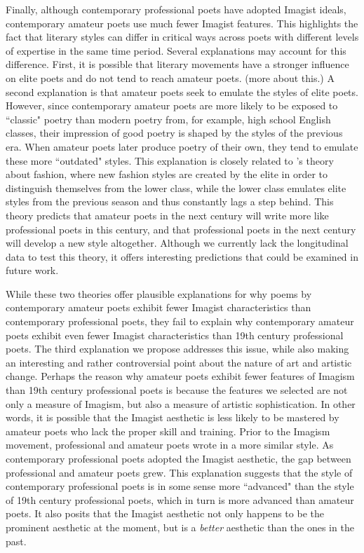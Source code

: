 \documentclass{book}
\begin{document}
Finally, although contemporary professional poets have adopted Imagist ideals, contemporary amateur poets use much fewer Imagist features. This highlights the fact that literary styles can differ in critical ways across poets with different levels of expertise in the same time period. Several explanations may account for this difference. First, it is possible that literary movements have a stronger influence on elite poets and do not tend to reach amateur poets. (more about this.) A second explanation is that amateur poets seek to emulate the styles of elite poets. However, since contemporary amateur poets are more likely to be exposed to ``classic" poetry than modern poetry from, for example, high school English classes, their impression of good poetry is shaped by the styles of the previous era. When amateur poets later produce poetry of their own, they tend to emulate these more ``outdated" styles. This explanation is closely related to \cite{simmel1957fashion}'s theory about fashion, where new fashion styles are created by the elite in order to distinguish themselves from the lower class, while the lower class emulates elite styles from the previous season and thus constantly lags a step behind. This theory predicts that amateur poets in the next century will write more like professional poets in this century, and that professional poets in the next century will develop a new style altogether. Although we currently lack the longitudinal data to test this theory, it offers interesting predictions that could be examined in future work.

While these two theories offer plausible explanations for why poems by contemporary amateur poets exhibit fewer Imagist characteristics than contemporary professional poets, they fail to explain why contemporary amateur poets exhibit even fewer Imagist characteristics than 19th century professional poets. The third explanation we propose addresses this issue, while also making an interesting and rather controversial point about the nature of art and artistic change. Perhaps the reason why amateur poets exhibit fewer features of Imagism than 19th century professional poets is because the features we selected are not only a measure of Imagism, but also a measure of artistic sophistication. In other words, it is possible that the Imagist aesthetic is less likely to be mastered by amateur poets who lack the proper skill and training. Prior to the Imagism movement, professional and amateur poets wrote in a more similar style. As contemporary professional poets adopted the Imagist aesthetic, the gap between professional and amateur poets grew. This explanation suggests that the style of contemporary professional poets is in some sense more ``advanced" than the style of 19th century professional poets, which in turn is more advanced than amateur poets. It also posits that the Imagist aesthetic not only happens to be the prominent aesthetic at the moment, but is a \emph{better} aesthetic than the ones in the past.
\end{document}
